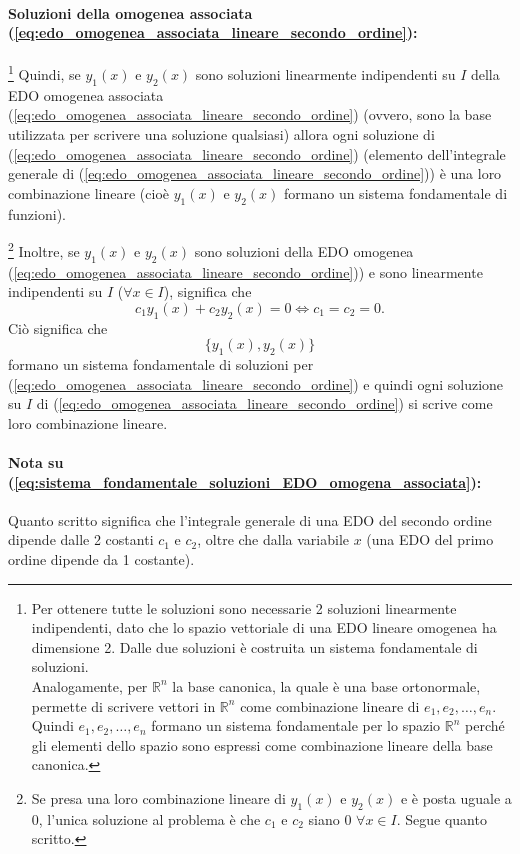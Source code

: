 \paragraph{Soluzioni della omogenea associata (\ref{eq:edo_omogenea_associata_lineare_secondo_ordine}): }\footnote{Per ottenere tutte le soluzioni sono necessarie 2 soluzioni linearmente indipendenti, dato che lo spazio vettoriale di una EDO lineare omogenea ha dimensione 2. Dalle due soluzioni è costruita un sistema fondamentale di soluzioni.\\
Analogamente, per $\mathbb R^n$ la base canonica, la quale è una \gls{base ortonormale}, permette di scrivere vettori in $\mathbb R^n$ come combinazione lineare di $e_1,e_2,\hdots, e_n$. Quindi $e_1,e_2,\hdots, e_n$ formano un sistema fondamentale per lo spazio $\mathbb R^n$ perché gli elementi dello spazio sono espressi come combinazione lineare della base canonica.} Quindi, se $y_1(x)$ e $y_2(x)$ sono soluzioni linearmente indipendenti su $I$ della EDO omogenea associata (\ref{eq:edo_omogenea_associata_lineare_secondo_ordine}) (ovvero, sono la base utilizzata per scrivere una soluzione qualsiasi) allora ogni soluzione di (\ref{eq:edo_omogenea_associata_lineare_secondo_ordine}) (elemento dell'integrale generale di (\ref{eq:edo_omogenea_associata_lineare_secondo_ordine})) è una loro combinazione lineare (cioè $y_1(x)$ e $y_2(x)$ formano un sistema fondamentale di funzioni).

\noindent \footnote{Se presa una loro combinazione lineare di $y_1(x)$ e $y_2(x)$ e è posta uguale a 0, l'unica soluzione al problema è che $c_1$ e $c_2$ siano 0 $\forall x\in I$. Segue quanto scritto.} Inoltre, se $y_1(x)$ e $y_2(x)$ sono soluzioni della EDO omogenea (\ref{eq:edo_omogenea_associata_lineare_secondo_ordine})) e sono linearmente indipendenti su $I$ ($\forall x\in I$), significa che
\begin{equation*}
    c_1 y_1(x) + c_2 y_2(x) = 0 \iff c_1=c_2=0.
\end{equation*}
Ciò significa che
\begin{equation}\label{eq:sistema_fondamentale_soluzioni_EDO_omogena_associata}
    \{y_1(x), y_2(x)\}
\end{equation}
formano un sistema fondamentale di soluzioni per (\ref{eq:edo_omogenea_associata_lineare_secondo_ordine}) e quindi ogni soluzione su $I$ di (\ref{eq:edo_omogenea_associata_lineare_secondo_ordine}) si scrive come loro combinazione lineare.

\paragraph{Nota su (\ref{eq:sistema_fondamentale_soluzioni_EDO_omogena_associata}):} Quanto scritto significa che l'integrale generale di una EDO del secondo ordine dipende dalle 2 costanti $c_1$ e $c_2$, oltre che dalla variabile $x$ (una EDO del primo ordine dipende da 1 costante).

